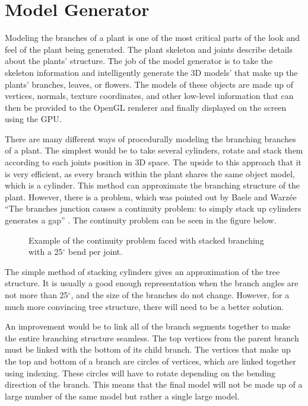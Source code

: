 \section{Model Generator}

Modeling the branches of a plant is one of the most critical parts of the look and feel of the plant being generated. The plant skeleton and joints describe details about the plants' structure. The job of the model generator is to take the skeleton information and intelligently generate the 3D models' that make up the plants' branches, leaves, or flowers. The models of these objects are made up of vertices, normals, texture coordinates, and other low-level information that can then be provided to the OpenGL renderer and finally displayed on the screen using the GPU.

There are many different ways of procedurally modeling the branching branches of a plant. The simplest would be to take several cylinders, rotate and stack them according to each joints position in 3D space. The upside to this approach that it is very efficient, as every branch within the plant shares the same object model, which is a cylinder. This method can approximate the branching structure of the plant. However, there is a problem, which was pointed out by Baele and Warz\'{e}e ``The branches junction causes a continuity problem: to simply stack up cylinders generates a gap'' \cite{baele2005real}. The continuity problem can be seen in the figure below.

\begin{figure}[htbp]
	{\centering
		\vspace{7px}
		\setlength{\fboxrule}{1pt}
		\caption{Example of the continuity problem faced with stacked branching with a 25$^{\circ}$ bend per joint.}
	}
\end{figure}

\FloatBarrier

\noindent
The simple method of stacking cylinders gives an approximation of the tree structure. It is usually a good enough representation when the branch angles are not more than 25$^{\circ}$, and the size of the branches do not change. However, for a much more convincing tree structure, there will need to be a better solution. 

An improvement would be to link all of the branch segments together to make the entire branching structure seamless. The top vertices from the parent branch must be linked with the bottom of its child branch. The vertices that make up the top and bottom of a branch are circles of vertices, which are linked together using indexing. These circles will have to rotate depending on the bending direction of the branch. This means that the final model will not be made up of a large number of the same model but rather a single large model. 

